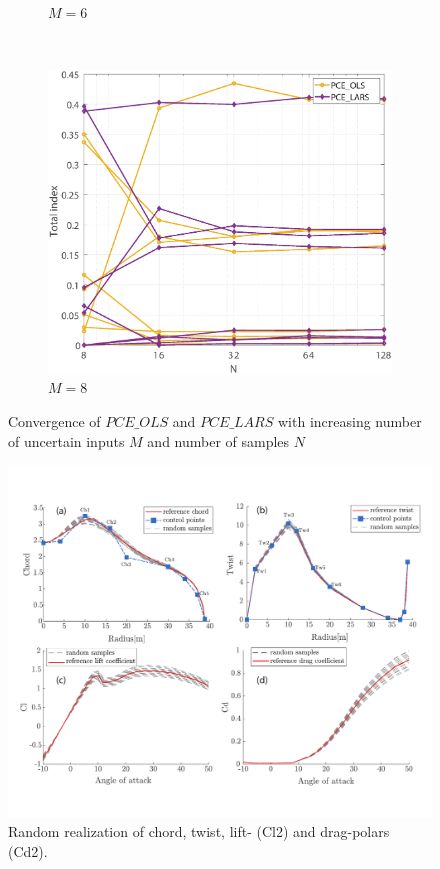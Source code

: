 \documentclass[review]{elsarticle}
\numberwithin{equation}{section}
\numberwithin{equation}{section}
\begin{document}
\begin{figure}[h!]
\begin{subfigure}[t]{0.32\textwidth}
        \caption{$M=6$}
    \end{subfigure}
      ~ 
    \begin{subfigure}[t]{0.32\textwidth}
        \centering
        \includegraphics[trim={1cm 0cm 0 0cm},clip, scale=0.22]{convergence_chord1_8.eps}
        \caption{ $M=8$}
 \end{subfigure}
    \caption{ Convergence of $PCE\_OLS$ and $PCE\_LARS$ with increasing number of uncertain inputs $M$ and number of samples $N$}
\end{figure}

\begin{figure}[h!]
\centering
\includegraphics[trim={1cm 0cm 0 0cm},clip, scale=0.67]{figure1.pdf}
\caption{Random realization of chord, twist, lift- (Cl2) and drag-polars (Cd2).}
\label{perturbed_samples}
\end{figure}
\end{document}
